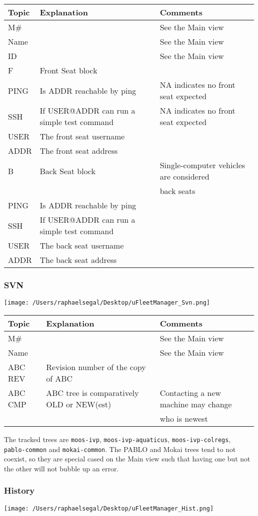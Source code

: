 \documentclass[11pt]{article}
\begin{document}
\begin{tabular}{l|ll}
Topic & Explanation & Comments\\
\hline
M\# && See the Main view\\
Name && See the Main view\\
ID && See the Main view\\
F & Front Seat block & \\
PING & Is ADDR reachable by ping & NA indicates no front seat expected\\
SSH & If USER@ADDR can run a simple test command & NA indicates no front seat expected\\
USER & The front seat username\\
ADDR & The front seat address\\
B & Back Seat block & Single-computer vehicles are considered \\&& back seats\\
PING & Is ADDR reachable by ping & \\
SSH & If USER@ADDR can run a simple test command & \\
USER & The back seat username\\
ADDR & The back seat address\\
\end{tabular}
\subsubsection{SVN}
\texttt{[image: /Users/raphaelsegal/Desktop/uFleetManager\_Svn.png]}

\begin{tabular}{l|ll}
Topic & Explanation & Comments\\
\hline
M\# && See the Main view\\
Name && See the Main view\\
ABC REV & Revision number of the copy of ABC & \\
ABC CMP & ABC tree is comparatively OLD or NEW(est) & Contacting a new machine may change \\&&who is newest\\
\end{tabular}
The tracked trees are \texttt{moos-ivp}, \texttt{moos-ivp-aquaticus}, \texttt{moos-ivp-colregs}, \texttt{pablo-common} and \texttt{mokai-common}. The PABLO and Mokai trees tend to not coexist, so they are special cased on the Main view such that having one but not the other will not bubble up an error.
\subsubsection{History}
\texttt{[image: /Users/raphaelsegal/Desktop/uFleetManager\_Hist.png]}
\end{document}

